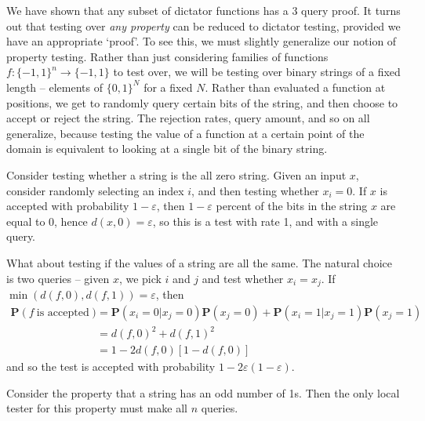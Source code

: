 We have shown that any subset of dictator functions has a 3 query proof. It turns out that testing over {\it any property} can be reduced to dictator testing, provided we have an appropriate `proof'. To see this, we must slightly generalize our notion of property testing. Rather than just considering families of functions $f: \{ -1, 1 \}^n \to \{ -1, 1 \}$ to test over, we will be testing over binary strings of a fixed length -- elements of $\{ 0, 1 \}^N$ for a fixed $N$. Rather than evaluated a function at positions, we get to randomly query certain bits of the string, and then choose to accept or reject the string. The rejection rates, query amount, and so on all generalize, because testing the value of a function at a certain point of the domain is equivalent to looking at a single bit of the binary string.

\begin{example}
    Consider testing whether a string is the all zero string. Given an input $x$, consider randomly selecting an index $i$, and then testing whether $x_i = 0$. If $x$ is accepted with probability $1 - \varepsilon$, then $1 - \varepsilon$ percent of the bits in the string $x$ are equal to $0$, hence $d(x,0) = \varepsilon$, so this is a test with rate 1, and with a single query.
\end{example}

\begin{example}
    What about testing if the values of a string are all the same. The natural choice is two queries -- given $x$, we pick $i$ and $j$ and test whether $x_i = x_j$. If $\min(d(f,0), d(f,1)) = \varepsilon$, then
    \begin{align*}
        \mathbf{P}(f\ \text{is accepted}) &= \mathbf{P}(x_i = 0 | x_j = 0) \mathbf{P}(x_j = 0) + \mathbf{P}(x_i = 1 | x_j = 1) \mathbf{P}(x_j = 1)\\
        &= d(f,0)^2 + d(f,1)^2\\
        &= 1 - 2d(f,0)[1 - d(f,0)]
    \end{align*}
    and so the test is accepted with probability $1 - 2\varepsilon(1 - \varepsilon)$.
\end{example}

\begin{example}
    Consider the property that a string has an odd number of 1s. Then the only local tester for this property must make all $n$ queries.
\end{example}

